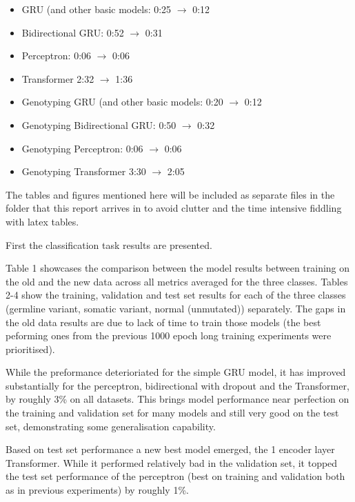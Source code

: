 \documentclass[11pt, a4paper]{article}
\begin{document}
\begin{itemize}

\item GRU (and other basic models: 0:25 $ \rightarrow $ 0:12
\item Bidirectional GRU: 0:52 $ \rightarrow $ 0:31
\item Perceptron: 0:06 $ \rightarrow $ 0:06
\item Transformer 2:32 $ \rightarrow $ 1:36

\item Genotyping GRU (and other basic models: 0:20 $ \rightarrow $ 0:12
\item Genotyping Bidirectional GRU: 0:50 $ \rightarrow $ 0:32
\item Genotyping Perceptron: 0:06 $ \rightarrow $ 0:06
\item Genotyping Transformer 3:30 $ \rightarrow $ 2:05

\end{itemize}

The tables and figures mentioned here will be included as separate files in the folder that this report arrives in to avoid clutter and the time intensive fiddling with latex tables.

First the classification task results are presented.

Table 1 showcases the comparison between the model results between training on the old and the new data across all metrics averaged for the three classes. Tables 2-4 show the training, validation and test set results for each of the three classes (germline variant, somatic variant, normal (unmutated)) separately. The gaps in the old data results are due to lack of time to train those models (the best peforming ones from the previous 1000 epoch long training experiments were prioritised).

While the preformance deterioriated for the simple GRU model, it has improved substantially for the perceptron, bidirectional with dropout and the Transformer, by roughly 3\% on all datasets. This brings model performance near perfection on the training and validation set for many models and still very good on the test set, demonstrating some generalisation capability.

Based on test set performance a new best model emerged, the 1 encoder layer Transformer. While it performed relatively bad in the validation set, it topped the test set performance of the perceptron (best on training and validation both as in previous experiments) by roughly 1\%. 
\end{document}
